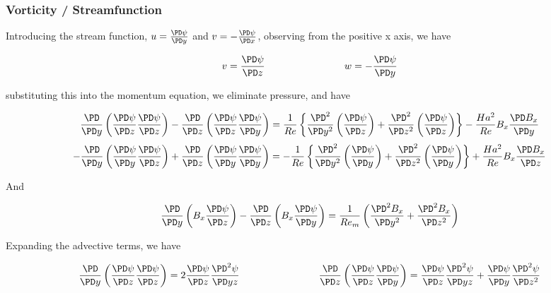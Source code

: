 \documentclass[11pt]{article}
\begin{document}
\subsubsection{Vorticity / Streamfunction}

Introducing the stream function, $u = \frac{\PD \psi}{\PD y}$ and $v = - \frac{\PD \psi}{\PD x}$, observing from the positive x axis, we have

\begin{equation}
	v = \frac{\PD \psi}{\PD z}
	\qquad \qquad \qquad \qquad
	w = - \frac{\PD \psi}{\PD y}
\end{equation}

substituting this into the momentum equation, we eliminate pressure, and have

\begin{equation}
	\frac{\PD}{\PD y}
	\left(
	\frac{\PD \psi}{\PD z}
	\frac{\PD \psi}{\PD z}
	\right)
	-
	\frac{\PD}{\PD z}
	\left(
	\frac{\PD \psi}{\PD z}
	\frac{\PD \psi}{\PD y}
	\right)
	=
	\frac{1}{Re}
	\left\{
	\frac{\PD^2}{\PD y^2}
	\left(
	\frac{\PD \psi}{\PD z}
	\right)
	+
	\frac{\PD^2}{\PD z^2}
	\left(
	\frac{\PD \psi}{\PD z}
	\right)
	\right\}
	-
	\frac{Ha^2}{Re}
	B_x
	\frac{\PD B_x}{\PD y}
\end{equation}
\begin{equation}
	-\frac{\PD}{\PD y}
	\left(
	\frac{\PD \psi}{\PD y}
	\frac{\PD \psi}{\PD z}
	\right)
	+ \frac{\PD}{\PD z}
	\left(
	\frac{\PD \psi}{\PD y}
	\frac{\PD \psi}{\PD y}
	\right)
	=
	- \frac{1}{Re}
	\left\{
	\frac{\PD^2}{\PD y^2}
	\left(
	\frac{\PD \psi}{\PD y}
	\right)
	+\frac{\PD^2}{\PD z^2}
	\left(
	\frac{\PD \psi}{\PD y}
	\right)
	\right\}
	+ \frac{Ha^2}{Re}
	B_x
	\frac{\PD B_x}{\PD z}
\end{equation}

And

\begin{equation}
	\frac{\PD}{\PD y} \left( B_x \frac{\PD \psi}{\PD z} \right)
	- \frac{\PD}{\PD z} \left( B_x \frac{\PD \psi}{\PD y} \right)
	=
	\frac{1}{Re_m}
	\left(
	\frac{\PD^2 B_x}{\PD y^2}
	+ \frac{\PD^2 B_x}{\PD z^2}
	\right)
\end{equation}

Expanding the advective terms, we have

\begin{equation}
	\frac{\PD}{\PD y}
	\left(
	\frac{\PD \psi}{\PD z}
	\frac{\PD \psi}{\PD z}
	\right)
	=
	2
	\frac{\PD \psi }{\PD z}
	\frac{\PD^2 \psi}{\PD yz}
	\qquad \qquad
	\qquad \qquad
	\frac{\PD}{\PD z}
	\left(
	\frac{\PD \psi}{\PD z}
	\frac{\PD \psi}{\PD y}
	\right)
	=
	\frac{\PD \psi}{\PD z}
	\frac{\PD^2 \psi}{\PD yz} +
	\frac{\PD \psi}{\PD y}
	\frac{\PD^2 \psi}{\PD z^2}
\end{equation}
\end{document}
